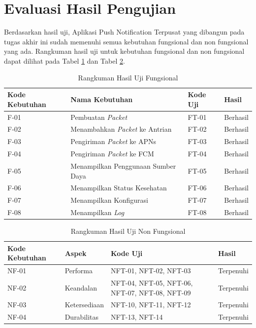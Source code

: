 \section{Evaluasi Hasil Pengujian}
\par Berdasarkan hasil uji, Aplikasi Push Notification Terpusat yang dibangun pada tugas akhir ini sudah memenuhi semua kebutuhan fungsional dan non fungsional yang ada. Rangkuman hasil uji untuk kebutuhan fungsional dan non fungsional dapat dilihat pada Tabel \ref{t:eval_f} dan Tabel \ref{t:eval_nf}.
\begin{longtable}{|p{1.5cm}|p{3cm}|p{1.5cm}|p{1.5cm}|}
	\caption{Rangkuman Hasil Uji Fungsional} \label{t:eval_f} \\ \hline
	\rowcolor{lightgray} Kode Kebutuhan & Nama Kebutuhan & Kode Uji & Hasil \\ \hline
	F-01 & Pembuatan \textit{Packet} & FT-01 & Berhasil \\ \hline
	F-02 & Menambahkan \textit{Packet} ke Antrian & FT-02 & Berhasil \\ \hline
	F-03 & Pengiriman \textit{Packet} ke APNs & FT-03 & Berhasil \\ \hline
	F-04 & Pengiriman \textit{Packet} ke FCM & FT-04 & Berhasil \\ \hline
	F-05 & Menampilkan Penggunaan Sumber Daya & FT-05 & Berhasil \\ \hline
	F-06 & Menampilkan Status Kesehatan & FT-06 & Berhasil \\ \hline
	F-07 & Menampilkan Konfigurasi & FT-07 & Berhasil \\ \hline
	F-08 & Menampilkan \textit{Log} & FT-08 & Berhasil \\ \hline
\end{longtable}
\begin{longtable}{|p{1.5cm}|p{2cm}|p{3cm}|p{1.5cm}|}
	\caption{Rangkuman Hasil Uji Non Fungsional} \label{t:eval_nf} \\ \hline
	\rowcolor{lightgray} Kode Kebutuhan & Aspek & Kode Uji & Hasil \\ \hline
	NF-01 & Performa & NFT-01, NFT-02, NFT-03 & Terpenuhi \\ \hline
	NF-02 & Keandalan & NFT-04, NFT-05, NFT-06, NFT-07, NFT-08, NFT-09 & Terpenuhi \\ \hline
	NF-03 & Ketersediaan & NFT-10, NFT-11, NFT-12 & Terpenuhi \\ \hline
	NF-04 & Durabilitas & NFT-13, NFT-14 & Terpenuhi \\ \hline
\end{longtable}
